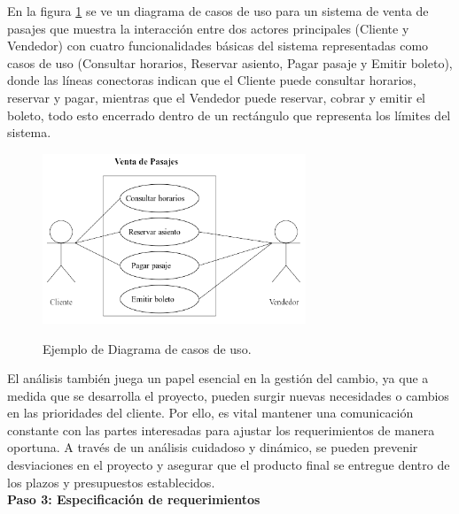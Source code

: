 		\vspace{-12pt}  %
		En la figura \ref{fig:figura_caso_uso} se ve un diagrama de casos de uso para un sistema de venta de pasajes que muestra la interacción entre dos actores principales (Cliente y Vendedor) con cuatro funcionalidades básicas del sistema representadas como casos de uso (Consultar horarios, Reservar asiento, Pagar pasaje y Emitir boleto), donde las líneas conectoras indican que el Cliente puede consultar horarios, reservar y pagar, mientras que el Vendedor puede reservar, cobrar y emitir el boleto, todo esto encerrado dentro de un rectángulo que representa los límites del sistema.
		
		\vspace{0.3cm} %
		
		\begin{figure}[h] %
			\caption[Ejemplo Diagrama de casos de uso]
			{\newline Ejemplo de Diagrama de casos de uso.} %
			\vspace{0.3cm}
			\centering
			\includegraphics[width=0.7\textwidth]{imagenes/diagramas_casos_de_uso/venta-pasajes-casos-uso.png} %
			\vspace{0.3cm}
			\vspace{-0.6cm}
			\label{fig:figura_caso_uso} %
		\end{figure}		
		
		El análisis también juega un papel esencial en la gestión del cambio, ya que a medida que se desarrolla el proyecto, pueden surgir nuevas necesidades o cambios en las prioridades del cliente. Por ello, es vital mantener una comunicación constante con las partes interesadas para ajustar los requerimientos de manera oportuna. A través de un análisis cuidadoso y dinámico, se pueden prevenir desviaciones en el proyecto y asegurar que el producto final se entregue dentro de los plazos y presupuestos establecidos.\\
		\textbf{Paso 3: Especificación de requerimientos}
		

